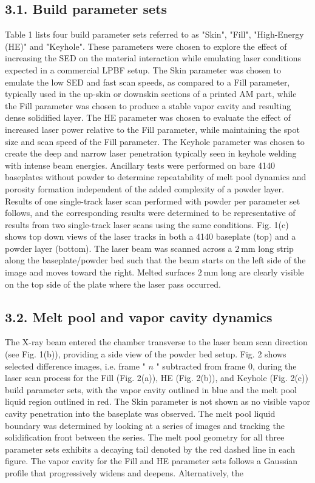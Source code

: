 \documentclass[10pt]{article}
\begin{document}
\subsection*{3.1. Build parameter sets}
Table 1 lists four build parameter sets referred to as "Skin", "Fill", "High-Energy (HE)" and "Keyhole". These parameters were chosen to explore the effect of increasing the SED on the material interaction while emulating laser conditions expected in a commercial LPBF setup. The Skin parameter was chosen to emulate the low SED and fast scan speeds, as compared to a Fill parameter, typically used in the up-skin or downskin sections of a printed AM part, while the Fill parameter was chosen to produce a stable vapor cavity and resulting dense solidified layer. The HE parameter was chosen to evaluate the effect of increased laser power relative to the Fill parameter, while maintaining the spot size and scan speed of the Fill parameter. The Keyhole parameter was chosen to create the deep and narrow laser penetration typically seen in keyhole welding with intense beam energies. Ancillary tests were performed on bare 4140 baseplates without powder to determine repeatability of melt pool dynamics and porosity formation independent of the added complexity of a powder layer. Results of one single-track laser scan performed with powder per parameter set follows, and the corresponding results were determined to be representative of results from two single-track laser scans using the same conditions. Fig. 1(c) shows top down views of the laser tracks in both a 4140 baseplate (top) and a powder layer (bottom). The laser beam was scanned across a $2 \mathrm{~mm}$ long strip along the baseplate/powder bed such that the beam starts on the left side of the image and moves toward the right. Melted surfaces $2 \mathrm{~mm}$ long are clearly visible on the top side of the plate where the laser pass occurred.

\subsection*{3.2. Melt pool and vapor cavity dynamics}
The X-ray beam entered the chamber transverse to the laser beam scan direction (see Fig. 1(b)), providing a side view of the powder bed setup. Fig. 2 shows selected difference images, i.e. frame " $n$ " subtracted from frame 0, during the laser scan process for the Fill (Fig. 2(a)), HE (Fig. 2(b)), and Keyhole (Fig. 2(c)) build parameter sets, with the vapor cavity outlined in blue and the melt pool liquid region outlined in red. The Skin parameter is not shown as no visible vapor cavity penetration into the baseplate was observed. The melt pool liquid boundary was determined by looking at a series of images and tracking the solidification front between the series. The melt pool geometry for all three parameter sets exhibits a decaying tail denoted by the red dashed line in each figure. The vapor cavity for the Fill and HE parameter sets follows a Gaussian profile that progressively widens and deepens. Alternatively, the
\end{document}
